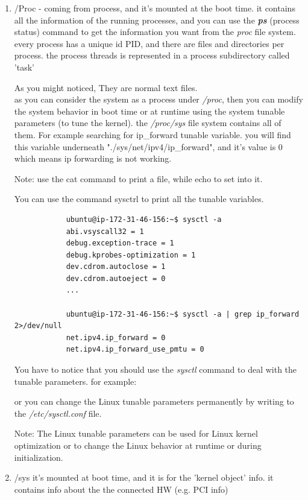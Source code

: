 \documentclass{article}
\begin{document}
\begin{enumerate}
    \item /Proc - coming from process, and it's mounted at the boot time.
        it contains all the information of the running processes, and you can use the \textit{\textbf{ps}} (process status) command to get the information you want from the \textit{proc} file system.
        every process has a unique id PID, and there are files and directories per process.
        the process threads is represented in a process subdirectory called 'task'

        
        As you might noticed, They are normal text files.\\
        
        as you can consider the system as a process under \textit{/proc}, then you can modify the system behavior in boot time or at runtime using the system tunable parameters (to tune the kernel). the \textit{/proc/sys} file system contains all of them.
        For example searching for ip\_forward tunable variable. you will find this variable underneath "./sys/net/ipv4/ip\_forward", and it's value is 0 which means ip forwarding is not working.
        

        Note: use the cat command to print a file, while echo to set into it.

        You can use the command sysctrl to print all the tunable variables.
        \begin{lstlisting}
            ubuntu@ip-172-31-46-156:~$ sysctl -a
            abi.vsyscall32 = 1
            debug.exception-trace = 1
            debug.kprobes-optimization = 1
            dev.cdrom.autoclose = 1
            dev.cdrom.autoeject = 0
            ...

            ubuntu@ip-172-31-46-156:~$ sysctl -a | grep ip_forward 2>/dev/null
            net.ipv4.ip_forward = 0
            net.ipv4.ip_forward_use_pmtu = 0

        \end{lstlisting}

        You have to notice that you should use the \textit{sysctl} command to deal with the tunable parameters. for example:

        or you can change the Linux tunable parameters permanently by writing to the \textit{/etc/sysctl.conf} file.
        

        Note: The Linux tunable parameters can be used for Linux kernel optimization or to change the Linux behavior at runtime or during initialization.

    \item /sys 
        it's mounted at boot time, and it is for the 'kernel object' info.
        it contains info about the the connected HW (e.g. PCI info)

        

\end{enumerate}
\end{document}
